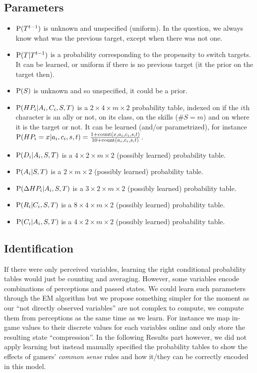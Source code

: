 \subsection{Parameters}

\begin{itemize}
    \item $\mathrm{P}(T^{t-1})$ is unknown and unspecified (uniform). In the question, we always know what was the previous target, except when there was not one.
    \item $\mathrm{P}(T|T^{t-1})$ is a probability corresponding to the propensity to switch targets. It can be learned, or uniform if there is no previous target (it the prior on the target then).
    \item $\mathrm{P}(S)$ is unknown and so unspecified, it could be a prior.
    \item $\mathrm{P}(HP_i | A_i, C_i, S, T)$ is a $2\times4\times m \times 2$ probability table, indexed on if the $i$th character is an ally or not, on its class, on the skills ($\#S=m$) and on where it is the target or not. It can be learned (and/or parametrized), for instance $\mathrm{P}(HP_i=x|a_i,c_i,s,t)=\frac{1+\mathrm{count}(x,a_i,c_i,s,t)}{10+\mathrm{count}(a_i,c_i,s,t)}$.
    \item $\mathrm{P}(D_i | A_i, S, T)$ is a $4\times2 \times m \times 2$ (possibly learned) probability table.
    \item $\mathrm{P}(A_i | S, T)$ is a $2 \times m \times 2$ (possibly learned) probability table.
    \item $\mathrm{P}(\Delta HP_i | A_i, S, T)$ is a $3 \times 2 \times m \times 2$ (possibly learned) probability table.
    \item $\mathrm{P}(R_i | C_i, S, T)$ is a $8 \times 4 \times m \times 2$ (possibly learned) probability table.
    \item $\mathrm{P}(C_i | A_i, S, T)$ is a $4 \times 2 \times m \times 2$ (possibly learned) probability table.
\end{itemize}

\subsection{Identification}

If there were only perceived variables, learning the right conditional probability tables would just be counting and averaging. However, some variables encode combinations of perceptions and passed states. We could learn such parameters through the EM algorithm but we propose something simpler for the moment as our ``not directly observed variables'' are not complex to compute, we compute them from perceptions as the same time as we learn. For instance we map in-game values to their discrete values for each variables online and only store the resulting state ``compression''. In the following Results part however, we did not apply learning but instead manually specified the probability tables to show the effects of gamers' \textit{common sense} rules and how it/they can be correctly encoded in this model.

